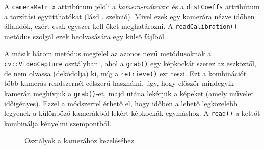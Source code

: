 A \texttt{cameraMatrix} attribútum jelöli a \textit{kamera-mátrix}ot és a \texttt{distCoeffs} attribútum a torzítási együtthatókat (lásd . szekció). Mivel ezek egy kamerára nézve időben állandók, ezért csak egyszer kell őket meghatározni. A \texttt{readCalibration()} metódus szolgál ezek beolvasására egy külső fájlból.  A másik három metódus megfelel az azonos nevű metódusoknak a \texttt{cv::VideoCapture} osztályban \cite{cv_video}, ahol a \texttt{grab()} egy képkockát szerez az eszköztől, de nem olvassa (dekódolja) ki, míg a \texttt{retrieve()} ezt teszi. Ezt a kombinációt több kamerás rendszernél célszerű használni, úgy, hogy először mindegyik kamerán meghívjuk a \texttt{grab()}-et, majd utána lekérjük a képeket (amely művelet időigényes). Ezzel a módszerrel érhető el, hogy időben a lehető legközelebb legyenek a különböző kamerákból lekért képkockák egymáshoz. A \texttt{read()} a kettőt kombinálja kényelmi szempontból.

\begin{figure}[t]
\centering


\caption{Osztályok a kamerához kezeléséhez \label{fig:cd:camera}}
\end{figure}


